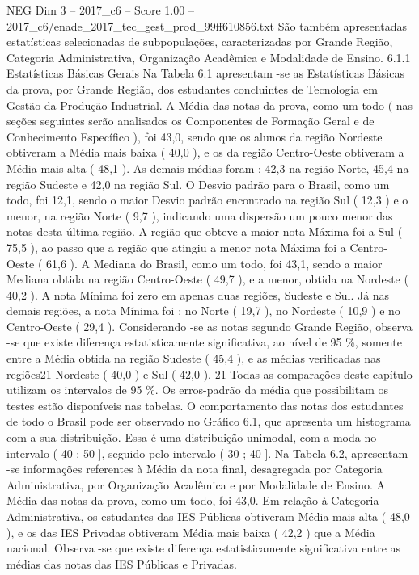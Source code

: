 \begin{textsample}{NEG Dim 3 – 2017\_c6 – Score 1.00 – 2017\_c6/enade\_2017\_tec\_gest\_prod\_99ff610856.txt}
São também apresentadas estatísticas selecionadas de subpopulações, caracterizadas por Grande Região, Categoria Administrativa, Organização Acadêmica e Modalidade de Ensino. 6.1.1 Estatísticas Básicas Gerais Na Tabela 6.1 apresentam -se as Estatísticas Básicas da prova, por Grande Região, dos estudantes concluintes de Tecnologia em Gestão da Produção Industrial.
A Média das notas da prova, como um todo ( nas seções seguintes serão analisados os Componentes de Formação Geral e de Conhecimento Específico ), foi 43,0, sendo que os alunos da região Nordeste obtiveram a Média mais baixa ( 40,0 ), e os da região Centro-Oeste obtiveram a Média mais alta ( 48,1 ).
As demais médias foram : 42,3 na região Norte, 45,4 na região Sudeste e 42,0 na região Sul.
O Desvio padrão para o Brasil, como um todo, foi 12,1, sendo o maior Desvio padrão encontrado na região Sul ( 12,3 ) e o menor, na região Norte ( 9,7 ), indicando uma dispersão um pouco menor das notas desta última região.
A região que obteve a maior nota Máxima foi a Sul ( 75,5 ), ao passo que a região que atingiu a menor nota Máxima foi a Centro-Oeste ( 61,6 ).
A Mediana do Brasil, como um todo, foi 43,1, sendo a maior Mediana obtida na região Centro-Oeste ( 49,7 ), e a menor, obtida na Nordeste ( 40,2 ).
A nota Mínima foi zero em apenas duas regiões, Sudeste e Sul.
Já nas demais regiões, a nota Mínima foi : no Norte ( 19,7 ), no Nordeste ( 10,9 ) e no Centro-Oeste ( 29,4 ).
Considerando -se as notas segundo Grande Região, observa -se que existe diferença estatisticamente significativa, ao nível de 95 \%, somente entre a Média obtida na região Sudeste ( 45,4 ), e as médias verificadas nas regiões21 Nordeste ( 40,0 ) e Sul ( 42,0 ). 21 Todas as comparações deste capítulo utilizam os intervalos de 95 \%.
Os erros-padrão da média que possibilitam os testes estão disponíveis nas tabelas.
O comportamento das notas dos estudantes de todo o Brasil pode ser observado no Gráfico 6.1, que apresenta um histograma com a sua distribuição.
Essa é uma distribuição unimodal, com a moda no intervalo ( 40 ; 50 ], seguido pelo intervalo ( 30 ; 40 ].
Na Tabela 6.2, apresentam -se informações referentes à Média da nota final, desagregada por Categoria Administrativa, por Organização Acadêmica e por Modalidade de Ensino.
A Média das notas da prova, como um todo, foi 43,0.
Em relação à Categoria Administrativa, os estudantes das IES Públicas obtiveram Média mais alta ( 48,0 ), e os das IES Privadas obtiveram Média mais baixa ( 42,2 ) que a Média nacional.
Observa -se que existe diferença estatisticamente significativa entre as médias das notas das IES Públicas e Privadas.

\end{textsample}
